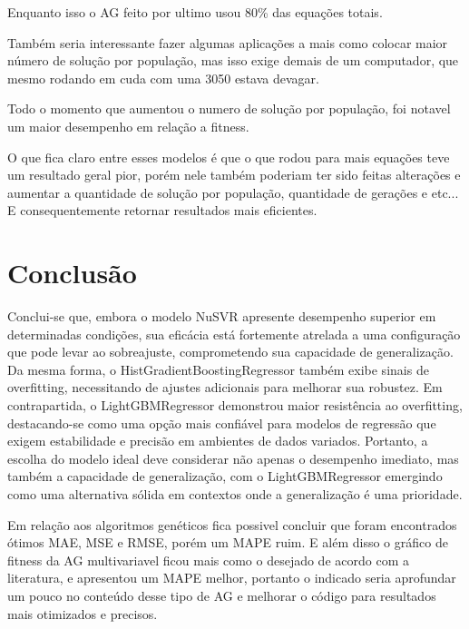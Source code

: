 \documentclass[journal]{IEEEtran}
\begin{document}
Enquanto isso o AG feito por ultimo usou 80\% das equações totais.

Também seria interessante fazer algumas aplicações a mais como colocar maior número de solução por população, mas isso exige demais de um computador, que mesmo rodando em cuda com uma 3050 estava devagar.

Todo o momento que aumentou o numero de solução por população, foi notavel um maior desempenho em relação a fitness.

O que fica claro entre esses modelos é que o que rodou para mais equações teve um resultado geral pior, porém nele também poderiam ter sido feitas alterações e aumentar a quantidade de solução por população, quantidade de gerações e etc... E consequentemente retornar resultados mais eficientes.


\section{Conclusão}

Conclui-se que, embora o modelo NuSVR apresente desempenho superior em determinadas condições, sua eficácia está fortemente atrelada a uma configuração que pode levar ao sobreajuste, comprometendo sua capacidade de generalização. Da mesma forma, o HistGradientBoostingRegressor também exibe sinais de overfitting, necessitando de ajustes adicionais para melhorar sua robustez. Em contrapartida, o LightGBMRegressor demonstrou maior resistência ao overfitting, destacando-se como uma opção mais confiável para modelos de regressão que exigem estabilidade e precisão em ambientes de dados variados. Portanto, a escolha do modelo ideal deve considerar não apenas o desempenho imediato, mas também a capacidade de generalização, com o LightGBMRegressor emergindo como uma alternativa sólida em contextos onde a generalização é uma prioridade.

Em relação aos algoritmos genéticos fica possivel concluir que foram encontrados ótimos MAE, MSE e RMSE, porém um MAPE ruim. E além disso o gráfico de fitness da AG multivariavel ficou mais como o desejado de acordo com a literatura, e apresentou um MAPE melhor, portanto o indicado seria aprofundar um pouco no conteúdo desse tipo de AG e melhorar o código para resultados mais otimizados e precisos.
\end{document}
